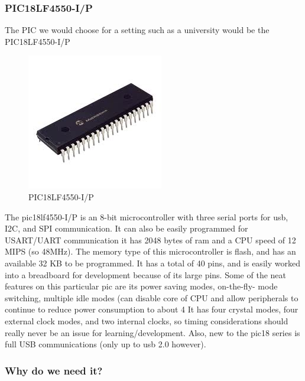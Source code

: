 \documentclass[12pt]{article}
\begin{document}
\subsubsection{PIC18LF4550-I/P}

The PIC we would choose for a setting such as a university would be the
PIC18LF4550-I/P

\begin{figure}[h!]
  \centering
  \includegraphics[scale=.5]{images/pic}
  \caption{PIC18LF4550-I/P}
  \label{img:pic}
\end{figure}


The pic18lf4550-I/P is an 8-bit microcontroller with three serial ports for usb, I2C, and SPI
communication. It can also be easily programmed for USART/UART communication it has 2048
bytes of ram and a CPU speed of 12 MIPS (so 48MHz). The memory type of this microcontroller
is flash, and has an available 32 KB to be programmed. It has a total of 40 pins, and is easily
worked into a breadboard for development because of its large pins.
Some of the neat features on this particular pic are its power saving modes, on-the-fly- mode
switching, multiple idle modes (can disable core of CPU and allow peripherals to continue to reduce
power consumption to about 4%
It has four crystal modes, four external clock modes, and two internal clocks, so timing
considerations should really never be an issue for learning/development.
Also, new to the pic18 series is full USB communications (only up to usb 2.0 however).

\subsubsection{Why do we need it?}
\end{document}
